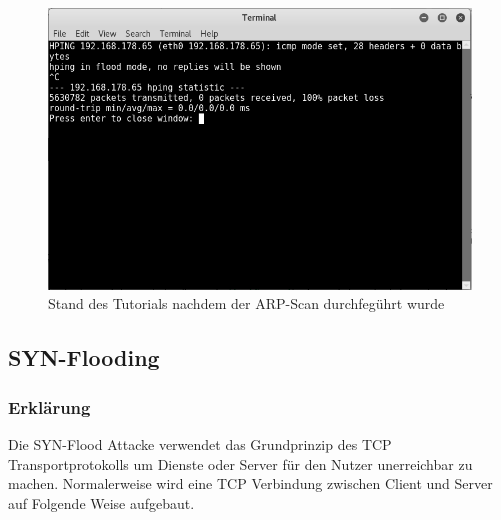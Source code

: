 \begin{figure}[H]
	\centering
	\includegraphics[width=\textwidth]{images/DOS/pingflood}
	\caption{Stand des Tutorials nachdem der ARP-Scan durchfegührt wurde}
	\label{fig:pingflood}
\end{figure}

\subsection{SYN-Flooding} 

\subsubsection{Erklärung}

Die SYN-Flood Attacke verwendet das Grundprinzip des TCP Transportprotokolls um Dienste oder Server für den Nutzer unerreichbar zu machen. Normalerweise wird eine TCP Verbindung zwischen Client und Server auf Folgende Weise aufgebaut. 

